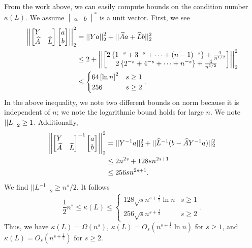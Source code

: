 From the work above, we can easily compute bounds on the condition number
$\kappa(L)$.
We assume $\begin{bmatrix}a & b\end{bmatrix}^{*}$ is a unit vector.
First, we see
%
\begin{align}
    \left| \left| \begin{bmatrix} Y & \\ \widehat{A} & \widehat{L} \end{bmatrix}
        \begin{bmatrix}a\\b\end{bmatrix} \right| \right|_{2}^{2}
        &= \left| \left| Ya \right| \right|_{2}^{2} + ||\widehat{A}a + \widehat{L}b||_{2}^{2}
            \nonumber\\
        &\le 2 + \left| \left| \begin{bmatrix}
            2\left\{ 1^{-s}+3^{-s}+\cdots+(n-1)^{-s} \right\}+\frac{4}{n^{1/2}} \\
            2\left\{ 2^{-s} + 4^{-s} + \cdots + n^{-s} \right\} + \frac{4}{n^{1/2}}
            \end{bmatrix} \right| \right|_{2}^{2} \nonumber\\
        &\le \begin{cases}
            64\left[ \ln n \right]^{2} &s\ge1 \\
            256 &s\ge2
        \end{cases}.
\end{align}
%
In the above inequality, we note two different bounds on norm because
it is independent of $n$; we note the logarithmic bound
holds for large $n$. We note $\left| \left| L \right| \right|_{2}\ge1$.
Additionally, 
%
\begin{align}
    \left| \left| \begin{bmatrix} Y & \\ \widehat{A} & \widehat{L} \end{bmatrix}^{-1}
        \begin{bmatrix}a\\b\end{bmatrix} \right| \right|_{2}^{2}
    &= ||Y^{-1}a||_{2}^{2} + ||\widehat{L}^{-1}(b-\widehat{A}Y^{-1}a)||_{2}^{2}
        \nonumber\\
    &\le 2n^{2s} + 128sn^{2s+1} \nonumber\\
    &\le 256sn^{2s+1}.
\end{align}
%
We find $||L^{-1}||_{2} \ge n^{s}/2$.
It follows
%
\begin{equation}
    \frac{1}{2}n^{s}\le \kappa(L) \le
        \begin{cases}
            128\sqrt{s}n^{s+\frac{1}{2}}\ln n &s\ge1 \\
            256\sqrt{s}n^{s+\frac{1}{2}} &s\ge2
        \end{cases}.
\end{equation}
%
Thus, we have $\kappa(L) = \Omega(n^{s})$,
$\kappa(L)=O_{s}(n^{s+\frac{1}{2}}\ln n)$ for $s\ge1$,
and $\kappa(L) = O_{s}(n^{s+\frac{1}{2}})$ for $s\ge2$.



